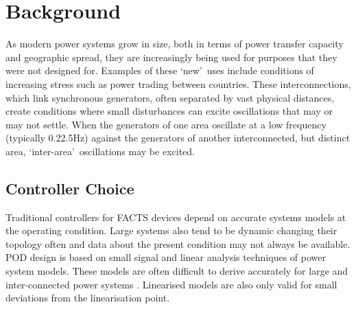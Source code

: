 \documentclass[journal]{IEEEtran}
\begin{document}
 

\section{Background}\label{Background}
As modern power systems grow in size, both in terms of power transfer capacity and geographic spread, they are increasingly being used for purposes that they were not designed for. Examples of these \textquoteleft new\textquoteright ~uses include conditions of increasing stress such as power trading between countries. These interconnections, which link synchronous generators, often separated by vast physical distances, create conditions where small disturbances can excite oscillations that may or may not settle. When the generators of one area oscillate at a low frequency (typically 0.2\textendash 2.5Hz) against the generators of another interconnected, but distinct area, \textquoteleft inter-area\textquoteright ~oscillations may be excited.\\



\subsection{Controller Choice}  %

Traditional controllers for FACTS devices depend on accurate systems models at the operating condition. Large systems also tend to be dynamic changing their topology often and data about the present condition may not always be available. POD design is based on small signal and linear analysis techniques of power system models. These models are often difficult to derive accurately for large and inter-connected power systems \cite{WAMTCSC}. Linearised models are also only valid for small deviations from the linearisation point.\\
\end{document}
